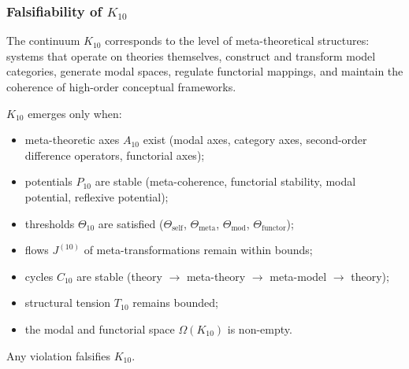 
\subsubsection{Falsifiability of $K_{10}$}
\label{sec:falsifiability-k10}

The continuum $K_{10}$ corresponds to the level of meta-theoretical
structures: systems that operate on theories themselves, construct and transform
model categories, generate modal spaces, regulate functorial mappings,
and maintain the coherence of high-order conceptual frameworks.

$K_{10}$ emerges only when:

\begin{itemize}
    \item meta-theoretic axes $A_{10}$ exist (modal axes, category axes,
          second-order difference operators, functorial axes);
    \item potentials $P_{10}$ are stable (meta-coherence, functorial stability,
          modal potential, reflexive potential);
    \item thresholds $\Theta_{10}$ are satisfied
          ($\Theta_{\mathrm{self}}$, $\Theta_{\mathrm{meta}}$, $\Theta_{\mathrm{mod}}$,
           $\Theta_{\mathrm{functor}}$);
    \item flows $J^{(10)}$ of meta-transformations remain within bounds;
    \item cycles $C_{10}$ are stable
          (theory $\rightarrow$ meta-theory $\rightarrow$ meta-model
          $\rightarrow$ theory);
    \item structural tension $T_{10}$ remains bounded;
    \item the modal and functorial space $\Omega(K_{10})$ is non-empty.
\end{itemize}

Any violation falsifies $K_{10}$.



